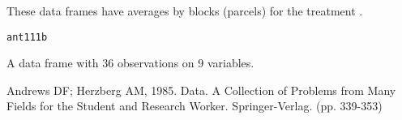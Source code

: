 \begin{Description}\relax
These data frames have averages by blocks (parcels) for the treatment
.
\end{Description}
\begin{Usage}
\begin{verbatim}ant111b\end{verbatim}
\end{Usage}
\begin{Format}\relax
A data frame with 36 observations on 9 variables.
\end{Format}
\begin{Source}\relax
Andrews DF; Herzberg AM, 1985. Data. A Collection of Problems from
Many Fields for the Student and Research Worker. Springer-Verlag.
(pp. 339-353)
\end{Source}

